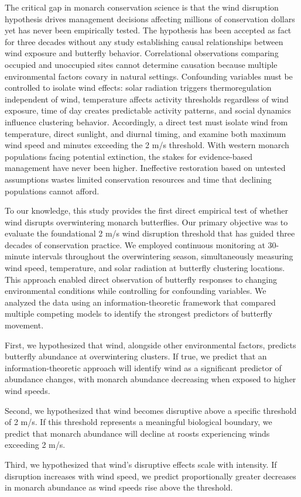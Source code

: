The critical gap in monarch conservation science is that the wind disruption hypothesis drives management decisions affecting millions of conservation dollars yet has never been empirically tested. The hypothesis has been accepted as fact for three decades without any study establishing causal relationships between wind exposure and butterfly behavior. Correlational observations comparing occupied and unoccupied sites cannot determine causation because multiple environmental factors covary in natural settings. Confounding variables must be controlled to isolate wind effects: solar radiation triggers thermoregulation independent of wind, temperature affects activity thresholds regardless of wind exposure, time of day creates predictable activity patterns, and social dynamics influence clustering behavior. Accordingly, a direct test must isolate wind from temperature, direct sunlight, and diurnal timing, and examine both maximum wind speed and minutes exceeding the 2 m/s threshold. With western monarch populations facing potential extinction, the stakes for evidence-based management have never been higher. Ineffective restoration based on untested assumptions wastes limited conservation resources and time that declining populations cannot afford.

To our knowledge, this study provides the first direct empirical test of whether wind disrupts overwintering monarch butterflies. Our primary objective was to evaluate the foundational 2 m/s wind disruption threshold that has guided three decades of conservation practice. We employed continuous monitoring at 30-minute intervals throughout the overwintering season, simultaneously measuring wind speed, temperature, and solar radiation at butterfly clustering locations. This approach enabled direct observation of butterfly responses to changing environmental conditions while controlling for confounding variables. We analyzed the data using an information-theoretic framework that compared multiple competing models to identify the strongest predictors of butterfly movement.

First, we hypothesized that wind, alongside other environmental factors, predicts butterfly abundance at overwintering clusters. If true, we predict that an information-theoretic approach will identify wind as a significant predictor of abundance changes, with monarch abundance decreasing when exposed to higher wind speeds.

Second, we hypothesized that wind becomes disruptive above a specific threshold of 2 m/s. If this threshold represents a meaningful biological boundary, we predict that monarch abundance will decline at roosts experiencing winds exceeding 2 m/s.

Third, we hypothesized that wind’s disruptive effects scale with intensity. If disruption increases with wind speed, we predict proportionally greater decreases in monarch abundance as wind speeds rise above the threshold.